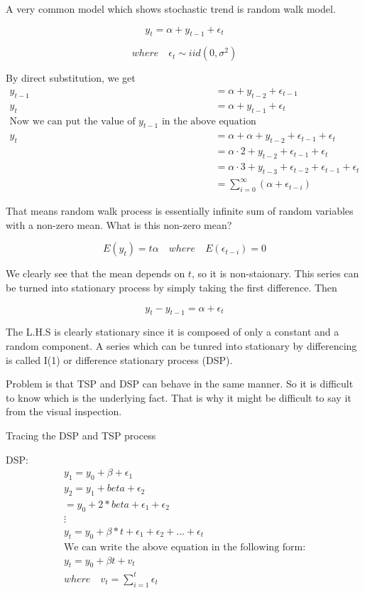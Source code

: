 \documentclass{book}
\begin{document}
A very common model which shows stochastic trend is random walk model. 

$$y_t = \alpha+y_{t-1}+\epsilon_t$$

$$where \quad \epsilon_t \sim iid(0,\sigma^2)$$

By direct substitution, we get
\begin{align*}
y_{t-1}&=\alpha+y_{t-2}+\epsilon_{t-1} \\
y_t&=\alpha+y_{t-1}+\epsilon_t \\
\mbox{Now we can put the value of } y_{t-1}  \mbox{ in the above equation}\\
y_t&=\alpha+\alpha+y_{t-2}+\epsilon_{t-1}+\epsilon_t \\
&=\alpha \cdot 2+y_{t-2}+\epsilon_{t-1}+\epsilon_t \\
&=\alpha \cdot 3+y_{t-3}+\epsilon_{t-2}+\epsilon_{t-1}+\epsilon_t \\
&=\sum_{i=0}^\infty(\alpha+\epsilon_{t-i})
\end{align*}

That means random walk process is essentially infinite sum of random variables with a non-zero mean. What is this non-zero mean?

$$E(y_t)=t\alpha \quad where \quad E(\epsilon_{t-i})=0$$

We clearly see that the mean depends on $t$, so it is non-staionary. This  series can be turned into stationary process by simply taking the first difference. Then

$$y_t-y_{t-1}=\alpha+\epsilon_t $$

The L.H.S is clearly  stationary since it is composed of only a constant and a random component. A series which can be tunred into stationary by differencing is called I(1) or difference stationary process (DSP).

Problem is that TSP and DSP can behave in the same manner. So it is difficult to know which is the underlying fact. That is why it might be difficult to say it from the visual inspection. 

Tracing the DSP and TSP process

DSP:
\begin{align*}
y_1=y_0+\beta+\epsilon_1 \\
y_2=y_1+beta+\epsilon_2 \\
   =y_0+2*beta+\epsilon_1+\epsilon_2 \\
\vdots \\
y_t=y_0+\beta*t+\epsilon_1+\epsilon_2+\ldots+\epsilon_t \\
\mbox{We can write the above equation in the following form:} \\
y_t=y_0+\beta t+v_t \\
where \quad  v_t=\sum_{i=1}^{t}\epsilon_t
\end{align*}
\end{document}
